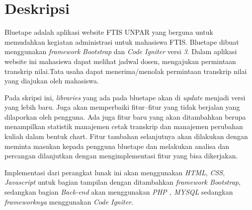 \documentclass[a4paper,twoside]{article}
\begin{document}
\title{\@judultopik}
\author{\nama \textendash \@npm} 

\newcommand{\nama}{Stephen Hadi}
\newcommand{\@npm}{2017730016}
\newcommand{\@judultopik}{Analisa Kekurangan dan Implementasi Perbaikan Perangkat Lunak Bluetape} %
\newcommand{\jumpemb}{1} %
\newcommand{\tanggal}{20/09/2020}


\maketitle


\section{Deskripsi}
Bluetape adalah aplikasi website FTIS UNPAR yang berguna untuk memudahkan kegiatan administrasi untuk mahasiswa FTIS.
Bluetape dibuat menggunakan \textit{framework} \textit{Bootstrap} dan \textit{Code Igniter} versi \textit{3}. Dalam aplikasi website ini mahasiswa dapat melihat jadwal dosen, mengajukan permintaan transkrip nilai.Tata usaha dapat menerima/menolak permintaan transkrip nilai yang diajukan oleh mahasiswa.

Pada skripsi ini, \textit{libraries} yang ada pada bluetape akan di \textit{update} menjadi versi yang lebih baru. Juga akan memperbaiki fitur--fitur yang tidak berjalan yang dilaporkan oleh pengguna. Ada juga fitur baru yang akan ditambahkan berupa menampilkan statistik manajemen cetak transkrip dan manajemen perubahan kuliah dalam bentuk chart. Fitur tambahan selanjutnya akan dilakukan dengan meminta masukan kepada pengguna bluetape dan melakukan analisa dan percangan dilanjutkan dengan mengimplementasi fitur yang bisa dikerjakan.

Implementasi dari perangkat lunak ini akan menggunakan \textit{HTML}, \textit{CSS}, \textit{Javascript} untuk bagian tampilan dengan ditambahkan \textit{framework Bootstrap}, sedangkan bagian \textit{Back-end} akan menggunakan \textit{PHP , MYSQL} sedangkan \textit{frameworknya} menggunakan \textit{Code Igniter}.
\end{document}
